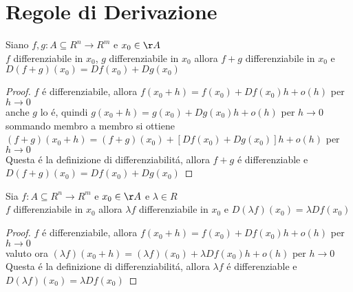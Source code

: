 \section{Regole di Derivazione}
\proposition
Siano $f,g: A\subseteq R^n \rightarrow R^m$ e $x_0\in\AA$\\
$f$ differenziabile in $x_0$, $g$ differenziabile in $x_0$ allora $f+g$ differenziabile in $x_0$ e $D(f+g)(x_0) = Df(x_0)+Dg(x_0)$
\begin{proof}
	$f$ \'e differenziabile, allora $f(x_0+h)=f(x_0)+Df(x_0)h+o(h)$ per $h\rightarrow 0$\\
	anche $g$ lo \'e, quindi $g(x_0+h)=g(x_0)+Dg(x_0)h+o(h)$ per $h\rightarrow 0$\\
	sommando membro a membro si ottiene  $(f+g)(x_0+h)=(f+g)(x_0)+[Df(x_0)+Dg(x_0)]h+o(h)$ per $h\rightarrow 0$\\
	Questa \'e la definizione di differenziabilit\'a, allora $f+g$ \'e differenziable e $D(f+g)(x_0) = Df(x_0)+Dg(x_0)$
\end{proof}

\proposition
Sia $f: A\subseteq R^n \rightarrow R^m$ e $x_0\in\AA$ e $\lambda\in R$\\
$f$ differenziabile in $x_0$ allora $\lambda f$ differenziabile in $x_0$ e $D(\lambda f)(x_0) = \lambda Df(x_0)$
\begin{proof}
	$f$ \'e differenziabile, allora $f(x_0+h)=f(x_0)+Df(x_0)h+o(h)$ per $h\rightarrow 0$\\
	valuto ora $(\lambda f)(x_0+h)=(\lambda f)(x_0)+\lambda Df(x_0)h+o(h)$ per $h\rightarrow 0$\\
	Questa \'e la definizione di differenziabilit\'a, allora $\lambda f$ \'e differenziable e $D(\lambda f)(x_0) = \lambda Df(x_0)$
\end{proof}


